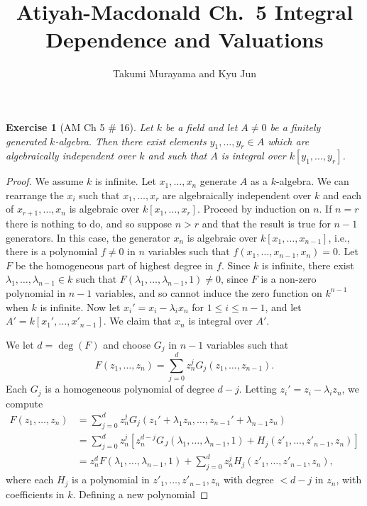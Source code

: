 \documentclass[12pt,letterpaper]{article}
\title{Atiyah-Macdonald Ch.~5 Integral Dependence and Valuations}
\author{Takumi Murayama and Kyu Jun}
\newtheorem{problem}{Exercise}[section]
\theoremstyle{definition}
\theoremstyle{remark}
\numberwithin{figure}{problem}
\numberwithin{equation}{section}
\begin{document}
\maketitle
\setcounter{section}{5}
\begin{problem}[AM Ch 5 \# 16]
  Let $k$ be a field and let $A \ne 0$ be a finitely generated $k$-algebra. Then there exist elements $y_1,\ldots,y_r \in A$ which are algebraically independent over $k$ and such that $A$ is integral over $k[y_1,\ldots,y_r]$.
\end{problem}
\begin{proof}
  We assume $k$ is infinite. Let $x_1,\ldots,x_n$ generate $A$ as a $k$-algebra. We can rearrange the $x_i$ such that $x_1,\ldots,x_r$ are algebraically independent over $k$ and each of $x_{r+1},\ldots,x_n$ is algebraic over $k[x_1,\ldots,x_r]$. Proceed by induction on $n$. If $n = r$ there is nothing to do, and so suppose $n > r$ and that the result is true for $n-1$ generators. In this case, the generator $x_n$ is algebraic over $k[x_1,\ldots,x_{n-1}]$, i.e., there is a polynomial $f \ne 0$ in $n$ variables such that $f(x_1,\ldots,x_{n-1},x_n) = 0$. Let $F$ be the homogeneous part of highest degree in $f$. Since $k$ is infinite, there exist $\lambda_1,\ldots,\lambda_{n-1} \in k$ such that $F(\lambda_1,\ldots,\lambda_{n-1},1) \ne 0$, since $F$ is a non-zero polynomial in $n-1$ variables, and so cannot induce the zero function on $k^{n-1}$ when $k$ is infinite. Now let $x_i' = x_i - \lambda_ix_n$ for $1 \le i \le n-1$, and let $A' = k[x_1',\ldots,x'_{n-1}]$. We claim that $x_n$ is integral over $A'$.
  \par We let $d = \deg(F)$ and choose $G_j$ in $n-1$ variables such that
  \begin{equation*}
    F(z_1,\ldots,z_n) = \sum_{j=0}^d z_n^jG_j(z_1,\ldots,z_{n-1}).
  \end{equation*}
  Each $G_j$ is a homogeneous polynomial of degree $d-j$. Letting $z_i' = z_i - \lambda_iz_n$, we compute
  \begin{align*}
    F(z_1,\ldots,z_n) &= \sum_{j=0}^d z_n^j G_j(z_1' + \lambda_1z_n,\ldots,z_{n-1}' + \lambda_{n-1}z_n)\\
    &= \sum_{j=0}^d z_n^j [z_n^{d-j}G_J(\lambda_1,\ldots,\lambda_{n-1},1)+H_j(z'_1,\ldots,z'_{n-1},z_n)]\\
    &= z_n^dF(\lambda_1,\ldots,\lambda_{n-1},1)+\sum_{j=0}^dz_n^jH_j(z'_1,\ldots,z'_{n-1},z_n),
  \end{align*}
  where each $H_j$ is a polynomial in $z'_1,\ldots,z'_{n-1},z_n$ with degree $< d-j$ in $z_n$, with coefficients in $k$. Defining a new polynomial

\end{proof}
\end{document}
